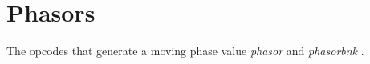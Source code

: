 \begin{comment}
\documentclass[10pt]{article}
\usepackage{fullpage, graphicx, url}
\setlength{\parskip}{1ex}
\setlength{\parindent}{0ex}
\title{Phasors}



\begin{tabular}{ccc}
The Alternative Csound Reference Manual & & \\
Previous &Signal Generators &Next

\end{tabular}

\end{comment}
\section{Phasors}


  The opcodes that generate a moving phase value \emph{phasor}
 and \emph{phasorbnk}
. 


\begin{comment}
\begin{tabular}{lcr}
Previous &Home &Next \\
Models and Emulations &Up &Random (Noise) Generators

\end{tabular}



\end{comment}
